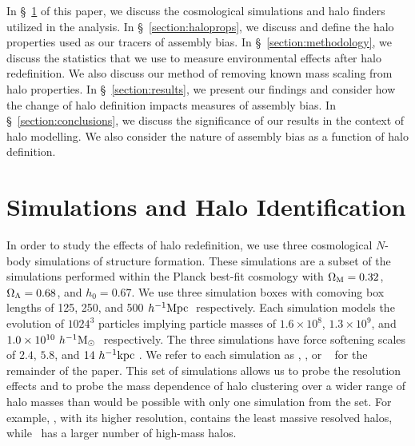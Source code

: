\documentclass[usenatbib,fleqn]{mnras}
\begin{document}
In \S~\ref{section:data} of this paper, we discuss the cosmological simulations and halo finders utilized in the analysis. In \S~\ref{section:haloprops}, we discuss 
and define the halo properties used as our tracers of assembly bias. In \S~\ref{section:methodology}, we discuss the statistics that we use to measure environmental effects after halo redefinition. We also discuss our method of removing known mass scaling from halo properties. In \S~\ref{section:results}, we present our findings and consider how the change of halo definition impacts measures of assembly bias. In \S~\ref{section:conclusions}, we discuss the significance of our results in the context of halo modelling. We also consider the nature of assembly bias as a function of halo definition.

\section[]{Simulations and Halo Identification}
\label{section:data}


In order to study the effects of halo redefinition, we use three cosmological $N$-body simulations of structure formation. These simulations are a subset of the  \citet{diemer_kravtsov15} simulations performed within the Planck best-fit cosmology with $\Omega_{\mathrm{M}} = 0.32$, $\Omega_{\Lambda} = 0.68$, and $h_0 = 0.67$. We use three simulation boxes with comoving box lengths of 125, 250, and 500$\ h^{-1}\mathrm{Mpc}~$ respectively. Each simulation models the evolution of $1024^3$ particles implying particle masses of $1.6 \times 10^8$, $1.3 \times 10^9$, and $1.0 \times 10^{10}\ h^{-1}\mathrm{M}_{\odot}~$ respectively. The three simulations have force softening scales of $2.4$, $5.8$, and $14 \ h^{-1}\mathrm{kpc}~$. We refer to each simulation as
\simA, \simB, or \simC~ for the remainder of the paper. This set of simulations allows us to probe the resolution effects and to probe the mass dependence of halo clustering over a wider range of halo masses than would be possible with only one
simulation from the set. For example, \simA, with its higher resolution, contains the least massive resolved halos, while \simC~has a larger number of high-mass halos.
\end{document}
